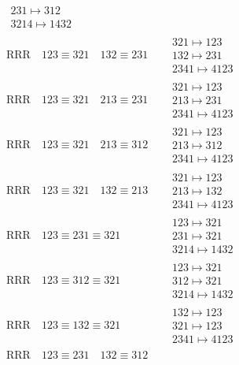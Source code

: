 \documentclass{article}
\begin{document}
\begin{align}
\begin{matrix}
231 \mapsto 312
\\
3214 \mapsto 1432
\end{matrix}
\\
\text{RRR}
\quad
123\equiv321
\quad
132\equiv231
\quad
&
\begin{matrix}
321 \mapsto 123
\\
132 \mapsto 231
\\
2341 \mapsto 4123
\end{matrix}
\\
\text{RRR}
\quad
123\equiv321
\quad
213\equiv231
\quad
&
\begin{matrix}
321 \mapsto 123
\\
213 \mapsto 231
\\
2341 \mapsto 4123
\end{matrix}
\\
\text{RRR}
\quad
123\equiv321
\quad
213\equiv312
\quad
&
\begin{matrix}
321 \mapsto 123
\\
213 \mapsto 312
\\
2341 \mapsto 4123
\end{matrix}
\\
\text{RRR}
\quad
123\equiv321
\quad
132\equiv213
\quad
&
\begin{matrix}
321 \mapsto 123
\\
213 \mapsto 132
\\
2341 \mapsto 4123
\end{matrix}
\\
\text{RRR}
\quad
123\equiv231\equiv321
\quad
&
\begin{matrix}
123 \mapsto 321
\\
231 \mapsto 321
\\
3214 \mapsto 1432
\end{matrix}
\\
\text{RRR}
\quad
123\equiv312\equiv321
\quad
&
\begin{matrix}
123 \mapsto 321
\\
312 \mapsto 321
\\
3214 \mapsto 1432
\end{matrix}
\\
\text{RRR}
\quad
123\equiv132\equiv321
\quad
&
\begin{matrix}
132 \mapsto 123
\\
321 \mapsto 123
\\
2341 \mapsto 4123
\end{matrix}
\\
\text{RRR}
\quad
123\equiv231
\quad
132\equiv312

\end{align}
\end{document}
